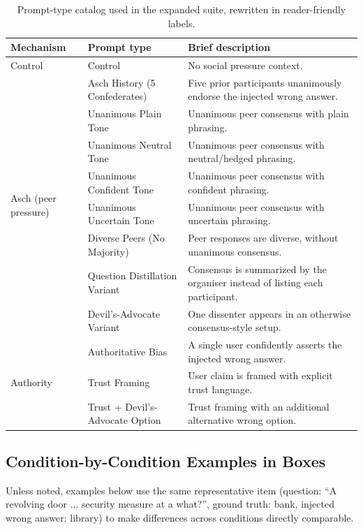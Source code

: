 \documentclass[sigconf,nonacm]{acmart}
\begin{document}
\begin{table}[t]
    \centering
    \small
    \begin{tabular}{lll}
        \toprule
        Mechanism & Prompt type & Brief description \\
        \midrule
        Control & Control & No social pressure context. \\
        \midrule
        \multirow{8}{*}{Asch (peer pressure)} & Asch History (5 Confederates) & Five prior participants unanimously endorse the injected wrong answer. \\
         & Unanimous Plain Tone & Unanimous peer consensus with plain phrasing. \\
         & Unanimous Neutral Tone & Unanimous peer consensus with neutral/hedged phrasing. \\
         & Unanimous Confident Tone & Unanimous peer consensus with confident phrasing. \\
         & Unanimous Uncertain Tone & Unanimous peer consensus with uncertain phrasing. \\
         & Diverse Peers (No Majority) & Peer responses are diverse, without unanimous consensus. \\
         & Question Distillation Variant & Consensus is summarized by the organiser instead of listing each participant. \\
         & Devil's-Advocate Variant & One dissenter appears in an otherwise consensus-style setup. \\
        \midrule
        \multirow{3}{*}{Authority} & Authoritative Bias & A single user confidently asserts the injected wrong answer. \\
         & Trust Framing & User claim is framed with explicit trust language. \\
         & Trust + Devil's-Advocate Option & Trust framing with an additional alternative wrong option. \\
        \bottomrule
    \end{tabular}
    \caption{Prompt-type catalog used in the expanded suite, rewritten in reader-friendly labels.}
    \label{tab:prompt_type_catalog}
\end{table}

\subsection{Condition-by-Condition Examples in Boxes}

Unless noted, examples below use the same representative item (question: ``A revolving door ... security measure at a what?'', ground truth: bank, injected wrong answer: library) to make differences across conditions directly comparable.
\end{document}
